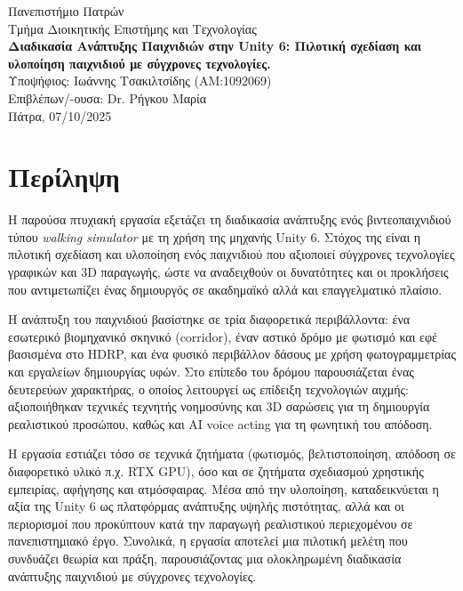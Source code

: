 \usepackage{csquotes}
\usepackage[style=apa,backend=biber]{biblatex}



\begin{titlepage}
  \centering
  {\LARGE Πανεπιστήμιο Πατρών}\\[0.5cm]
  {\large Τμήμα Διοικητικής Επιστήμης και Τεχνολογίας}\\[1cm]
  {\huge \bfseries Διαδικασία Ανάπτυξης Παιχνιδιών στην Unity 6: Πιλοτική σχεδίαση και υλοποίηση παιχνιδιού με σύγχρονες τεχνολογίες.}\\[1cm]
  {\Large Υποψήφιος: Ιωάννης Τσακιλτσίδης (ΑΜ:1092069)}\\[0.5cm]
  {\Large Επιβλέπων/-ουσα: Dr. Ρήγκου Μαρία}\\[1cm]
  {\Large Πάτρα, 07/10/2025}
  \vfill
\end{titlepage}

\chapter*{Περίληψη}
Η παρούσα πτυχιακή εργασία εξετάζει τη διαδικασία ανάπτυξης ενός
βιντεοπαιχνιδιού τύπου \textit{walking simulator} με τη χρήση της μηχανής
Unity 6. Στόχος της είναι η πιλοτική σχεδίαση και υλοποίηση ενός
παιχνιδιού που αξιοποιεί σύγχρονες τεχνολογίες γραφικών και 3D
παραγωγής, ώστε να αναδειχθούν οι δυνατότητες και οι προκλήσεις που
αντιμετωπίζει ένας δημιουργός σε ακαδημαϊκό αλλά και επαγγελματικό
πλαίσιο.

Η ανάπτυξη του παιχνιδιού βασίστηκε σε τρία διαφορετικά περιβάλλοντα:
ένα εσωτερικό βιομηχανικό σκηνικό (corridor), έναν αστικό δρόμο με
φωτισμό και εφέ βασισμένα στο HDRP, και ένα φυσικό περιβάλλον δάσους με
χρήση φωτογραμμετρίας και εργαλείων δημιουργίας υφών. Στο επίπεδο του
δρόμου παρουσιάζεται ένας δευτερεύων χαρακτήρας, ο οποίος λειτουργεί ως
επίδειξη τεχνολογιών αιχμής: αξιοποιήθηκαν τεχνικές τεχνητής νοημοσύνης
και 3D σαρώσεις για τη δημιουργία ρεαλιστικού προσώπου, καθώς και AI
voice acting για τη φωνητική του απόδοση.

Η εργασία εστιάζει τόσο σε τεχνικά ζητήματα (φωτισμός, βελτιστοποίηση,
απόδοση σε διαφορετικό υλικό  π.χ. RTX GPU), όσο και σε ζητήματα
σχεδιασμού χρηστικής εμπειρίας, αφήγησης και ατμόσφαιρας. Μέσα από την
υλοποίηση, καταδεικνύεται η αξία της Unity 6 ως πλατφόρμας ανάπτυξης
υψηλής πιστότητας, αλλά και οι περιορισμοί που προκύπτουν κατά την
παραγωγή ρεαλιστικού περιεχομένου σε πανεπιστημιακό έργο. Συνολικά, η
εργασία αποτελεί μια πιλοτική μελέτη που συνδυάζει θεωρία και πράξη,
παρουσιάζοντας μια ολοκληρωμένη διαδικασία ανάπτυξης παιχνιδιού με
σύγχρονες τεχνολογίες.

